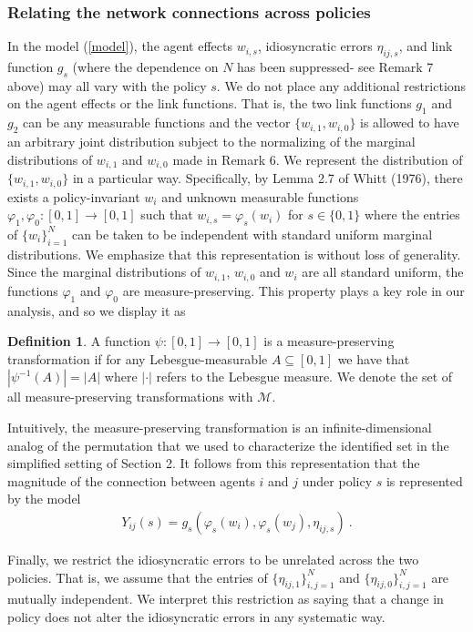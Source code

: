 \documentclass[12pt]{article}
\theoremstyle{definition}
\newtheorem{definition}{Definition}
\begin{document}
\subsubsection{Relating the network connections across policies}
In the model (\ref{model}), the agent effects $w_{i,s}$, idiosyncratic errors $\eta_{ij,s}$, and link function $g_{s}$ (where the dependence on $N$ has been suppressed- see Remark 7 above) may all vary with the policy $s$. We do not place any additional restrictions on the agent effects or the link functions. That is, the two link functions $g_1$ and $g_2$ can be any measurable functions and the vector $\{w_{i,1},w_{i,0}\}$ is allowed to have an arbitrary joint distribution subject to the normalizing of the marginal distributions of $w_{i,1}$ and $w_{i,0}$ made in Remark 6. We represent the distribution of $\{w_{i,1},w_{i,0}\}$ in a particular way. Specifically, by Lemma 2.7 of Whitt (1976), there exists a policy-invariant $w_i$ and unknown measurable functions $\varphi_{1}, \varphi_{0}: [0,1] \to [0,1]$ such that $w_{i,s} = \varphi_{s}\left(w_i\right)$ for $s \in \{0,1\}$ where the entries of $\{w_i\}_{i=1}^{N}$ can be taken to be independent with standard uniform marginal distributions. We emphasize that this representation is without loss of generality.  Since the marginal distributions of $w_{i,1}$, $w_{i,0}$ and $w_i$ are all standard uniform, the functions $\varphi_1$ and $\varphi_0$ are measure-preserving. This property plays a key role in our analysis, and so we display it as  
\begin{definition}
A function $\psi: [0,1] \to [0,1]$ is a measure-preserving transformation if for any Lebesgue-measurable $A \subseteq [0,1]$ we have that $|\psi^{-1}(A)| = |A|$ where $|\cdot|$ refers to the Lebesgue measure. We denote the set of all measure-preserving transformations with $\mathcal{M}$.   
\end{definition}
Intuitively, the measure-preserving transformation is an infinite-dimensional analog of the permutation that we used to characterize the identified set in the simplified setting of Section 2. It follows from this representation that the magnitude of the connection between agents $i$ and $j$ under policy $s$ is represented by the model   
\begin{align}\label{model2}
Y_{ij}(s) =  g_{s}(\varphi_s(w_{i}),\varphi_s(w_{j}),\eta_{ij,s})~.
\end{align}


Finally, we restrict the idiosyncratic errors to be unrelated across the two policies. That is, we assume that the entries of $\{\eta_{ij,1}\}_{i,j = 1}^{N}$ and  $\{\eta_{ij,0}\}_{i,j = 1}^{N}$ are mutually independent. We interpret this restriction as saying that a change in policy does not alter the idiosyncratic errors in any systematic way.    
\end{document}
